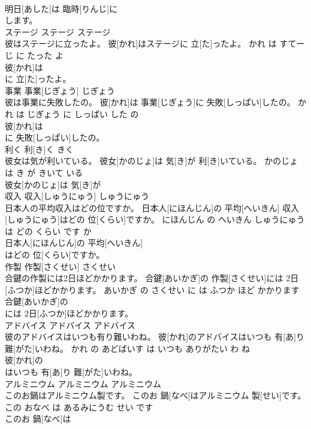 \documentclass[8pt]{extreport}
\begin{document}
\begin{CJK}{UTF8}{min}
\\	明日[あした]は 臨時[りんじ]に
\\	します。			
\\	ステージ	ステージ	ステージ	
\\	彼はステージに立ったよ。	彼[かれ]はステージに 立[た]ったよ。	かれ は すてーじ に たった よ	
\\	彼[かれ]は
\\	に 立[た]ったよ。			
\\	事業	事業[じぎょう]	じぎょう	
\\	彼は事業に失敗したの。	彼[かれ]は 事業[じぎょう]に 失敗[しっぱい]したの。	かれ は じぎょう に しっぱい した の	
\\	彼[かれ]は
\\	に 失敗[しっぱい]したの。			
\\	利く	利[き]く	きく	
\\	彼女は気が利いている。	彼女[かのじょ]は 気[き]が 利[き]いている。	かのじょ は き が きいて いる	
\\	彼女[かのじょ]は 気[き]が
\\	収入	収入[しゅうにゅう]	しゅうにゅう	
\\	日本人の平均収入はどの位ですか。	日本人[にほんじん]の 平均[へいきん] 収入[しゅうにゅう]はどの 位[くらい]ですか。	にほんじん の へいきん しゅうにゅう は どの くらい です か	
\\	日本人[にほんじん]の 平均[へいきん]
\\	はどの 位[くらい]ですか。			
\\	作製	作製[さくせい]	さくせい	
\\	合鍵の作製には2日ほどかかります。	合鍵[あいかぎ]の 作製[さくせい]には 2日[ふつか]ほどかかります。	あいかぎ の さくせい に は ふつか ほど かかります	
\\	合鍵[あいかぎ]の
\\	には 2日[ふつか]ほどかかります。			
\\	アドバイス	アドバイス	アドバイス	
\\	彼のアドバイスはいつも有り難いわね。	彼[かれ]のアドバイスはいつも 有[あ]り 難[がた]いわね。	かれ の あどばいす は いつも ありがたい わ ね	
\\	彼[かれ]の
\\	はいつも 有[あ]り 難[がた]いわね。			
\\	アルミニウム	アルミニウム	アルミニウム	
\\	このお鍋はアルミニウム製です。	このお 鍋[なべ]はアルミニウム 製[せい]です。	この おなべ は あるみにうむ せい です	
\\	このお 鍋[なべ]は

\end{CJK}
\end{document}
